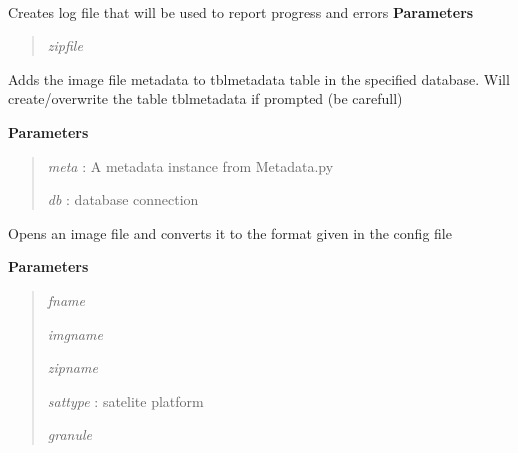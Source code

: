\documentclass[letterpaper,10pt,openany,oneside]{sphinxmanual}
\begin{document}
\begin{fulllineitems}
\label{code:SigLib.SigLib}~

\begin{fulllineitems}
\label{code:SigLib.SigLib.createLog}
Creates log file that will be used to report progress and errors
\textbf{Parameters}
\begin{quote}

\emph{zipfile}
\end{quote}

\end{fulllineitems}


\begin{fulllineitems}
\label{code:SigLib.SigLib.data2db}
Adds the image file metadata to tblmetadata table in the specified database.
Will create/overwrite the table tblmetadata if prompted (be carefull)

\textbf{Parameters}
\begin{quote}

\emph{meta} :   A metadata instance from Metadata.py

\emph{db}   :   database connection
\end{quote}

\end{fulllineitems}


\begin{fulllineitems}
\label{code:SigLib.SigLib.data2img}
Opens an image file and converts it to the format given in the config file

\textbf{Parameters}
\begin{quote}

\emph{fname}

\emph{imgname}

\emph{zipname}

\emph{sattype}  : satelite platform

\emph{granule}


\end{quote}
\end{fulllineitems}
\end{fulllineitems}
\end{document}
